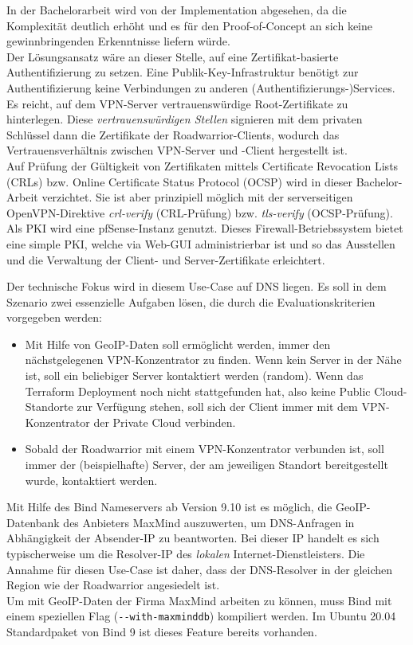 In der Bachelorarbeit wird von der Implementation abgesehen, da die Komplexität deutlich erhöht und es für den Proof-of-Concept an sich keine gewinnbringenden Erkenntnisse liefern würde.\\
Der Lösungsansatz wäre an dieser Stelle, auf eine Zertifikat-basierte Authentifizierung zu setzen. Eine Publik-Key-Infrastruktur benötigt zur Authentifizierung keine Verbindungen zu anderen (Authentifizierungs-)Services. Es reicht, auf dem VPN-Server vertrauenswürdige Root-Zertifikate zu hinterlegen. Diese \textit{vertrauenswürdigen Stellen} signieren mit dem privaten Schlüssel dann die Zertifikate der Roadwarrior-Clients, wodurch das Vertrauensverhältnis zwischen VPN-Server und -Client hergestellt ist.\\ 
Auf Prüfung der Gültigkeit von Zertifikaten mittels Certificate Revocation Lists (CRLs) bzw. Online Certificate Status Protocol (OCSP) wird in dieser Bachelor-Arbeit verzichtet. Sie ist aber prinzipiell möglich mit der serverseitigen OpenVPN-Direktive \textit{crl-verify} (CRL-Prüfung) bzw. \textit{tls-verify} (OCSP-Prüfung).\cite[S.116, S.325-327]{Keijser2011}\\
Als PKI wird eine pfSense-Instanz genutzt. Dieses Firewall-Betriebssystem bietet eine simple PKI, welche via Web-GUI administrierbar ist und so das Ausstellen und die Verwaltung der Client- und Server-Zertifikate erleichtert.\cite[S.376-383]{Netgate2020}

Der technische Fokus wird in diesem Use-Case auf DNS liegen. Es soll in dem Szenario zwei essenzielle Aufgaben lösen, die durch die Evaluationskriterien vorgegeben werden:
\begin{itemize}
\item Mit Hilfe von GeoIP-Daten soll ermöglicht werden, immer den nächstgelegenen VPN-Konzentrator zu finden. Wenn kein Server in der Nähe ist, soll ein beliebiger Server kontaktiert werden (random)\cite{bindrrset2020}. Wenn das Terraform \gls{Deployment} noch nicht stattgefunden hat, also keine Public Cloud-Standorte zur Verfügung stehen, soll sich der Client immer mit dem VPN-Konzentrator der Private Cloud verbinden.
\item Sobald der Roadwarrior mit einem VPN-Konzentrator verbunden ist, soll immer der (beispielhafte) Server, der am jeweiligen Standort bereitgestellt wurde, kontaktiert werden.
\end{itemize}

Mit Hilfe des Bind Nameservers ab Version 9.10 ist es möglich, die GeoIP-Datenbank des Anbieters MaxMind auszuwerten, um DNS-Anfragen in Abhängigkeit der Absender-IP zu beantworten\cite{bindgeoip2020}. Bei dieser IP handelt es sich typischerweise um die Resolver-IP des \textit{lokalen} Internet-Dienstleisters. Die Annahme für diesen Use-Case ist daher, dass der DNS-Resolver in der gleichen Region wie der Roadwarrior angesiedelt ist\label{dns-resolver-region}.\\
Um mit GeoIP-Daten der Firma MaxMind arbeiten zu können, muss Bind mit einem speziellen Flag (\texttt{-{}-with-maxminddb}) kompiliert werden. Im Ubuntu 20.04 Standardpaket von Bind 9 ist dieses Feature bereits vorhanden.

